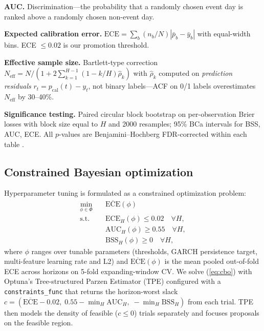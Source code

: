 \documentclass[11pt,a4paper]{article}
\newcommand{\pcal}{p_{\text{cal}}}
\newcommand{\Neff}{N_{\text{eff}}}
\begin{document}
\textbf{AUC.} Discrimination---the probability that a randomly chosen event day is ranked above a randomly chosen non-event day.

\textbf{Expected calibration error.} $\text{ECE} = \sum_b (n_b/N)|\bar{p}_b - \bar{y}_b|$ with equal-width bins. ECE $\leq 0.02$ is our promotion threshold.

\textbf{Effective sample size.} Bartlett-type correction $\Neff = N / (1 + 2\sum_{k=1}^{H-1}(1-k/H)\hat{\rho}_k)$ with $\hat{\rho}_k$ computed on \emph{prediction residuals} $r_t = \pcal(t) - y_t$, not binary labels---ACF on 0/1 labels overestimates $\Neff$ by 30--40\%.

\textbf{Significance testing.} Paired circular block bootstrap \cite{efron1993introduction} on per-observation Brier losses with block size equal to $H$ and 2000 resamples; 95\% BCa intervals for BSS, AUC, ECE. All $p$-values are Benjamini--Hochberg FDR-corrected within each table \cite{benjamini1995controlling}.

\subsection{Constrained Bayesian optimization}
\label{sec:bo}

Hyperparameter tuning is formulated as a constrained optimization problem:
\begin{equation}
  \begin{aligned}
    \min_{\phi \in \Phi} \quad & \overline{\text{ECE}}(\phi) \\
    \text{s.t.} \quad & \text{ECE}_H(\phi) \leq 0.02 \quad \forall H, \\
                      & \text{AUC}_H(\phi) \geq 0.55 \quad \forall H, \\
                      & \text{BSS}_H(\phi) \geq 0 \quad \forall H,
  \end{aligned}
  \label{eq:cbo}
\end{equation}
where $\phi$ ranges over tunable parameters (thresholds, GARCH persistence target, multi-feature learning rate and L2) and $\overline{\text{ECE}}(\phi)$ is the mean pooled out-of-fold ECE across horizons on 5-fold expanding-window CV. We solve (\ref{eq:cbo}) with Optuna's Tree-structured Parzen Estimator (TPE) \cite{bergstra2011algorithms} configured with a \texttt{constraints\_func} that returns the horizon-worst slack $c = (\overline{\text{ECE}} - 0.02,\; 0.55 - \min_H \text{AUC}_H,\; -\min_H \text{BSS}_H)$ from each trial. TPE then models the density of feasible ($c \leq 0$) trials separately and focuses proposals on the feasible region.
\end{document}
